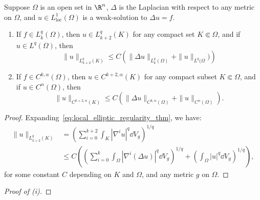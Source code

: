 \begin{theorem}
  \label{thm:local_elliptic_regularity}

  Suppose $\Omega$ is an open set in $\R^n$, $\Delta$ is the Laplacian with respect to any metric on $\Omega$, and $u \in L^1_{\text{loc}}(\Omega)$ is a weak-solution to $\Delta u = f$.

  \begin{enumerate}
    \item If $f \in L^q_k(\Omega)$, then $u \in L^q_{k+2}(K)$ for any compact set $K \Subset \Omega$, and if $u \in L^q(\Omega)$, then
      \begin{equation}\label{eq:local_elliptic_regularity_thm}
        \|u\|_{L^q_{k+2}(K)} \le C\left(\|\Delta u\|_{L^q_k(\Omega)} + \|u\|_{L^q(\Omega})\right)
      \end{equation}

    \item If $f \in C^{k,\alpha}(\Omega)$, then $u \in C^{k+2,\alpha}(K)$ for any compact subset $K \Subset \Omega$, and if $u \in C^\alpha(\Omega)$, then
      \[%
        \|u\|_{C^{k+2,\alpha}(K)} \le C\left(\|\Delta u\|_{C^{k,\alpha}(\Omega)} + \|u\|_{C^\alpha(\Omega)}\right)
      .\]%
  \end{enumerate}
\end{theorem}

\begin{computational-work}\leavevmode
  \label{cw:local_elliptic_regularity}
\end{computational-work}

\begin{proof}
  Expanding~\cref{eq:local_elliptic_regularity_thm}, we have:
  \begin{align*}
    \|u\|_{L^q_{k+2}(K)} &= \left(\sum_{i=0}^{k+2} \int_K \left\lvert\nabla^i u\right\rvert^q \dd{V}_g\right)^{1/q} \\
                          &\le C\left(\left(\sum_{i=0}^k \int_\Omega \left\lvert\nabla^i \left(\Delta u\right)\right\rvert^q \dd{V}_g\right)^{1/q} + \left(\int_\Omega |u|^q \dd{V}_g\right)^{1/q}\right)
  ,\end{align*}
  for some constant $C$ depending on $K$ and $\Omega$, and any metric $g$ on $\Omega$.
\end{proof}

\begin{proof}[Proof of (i)]
\end{proof}

